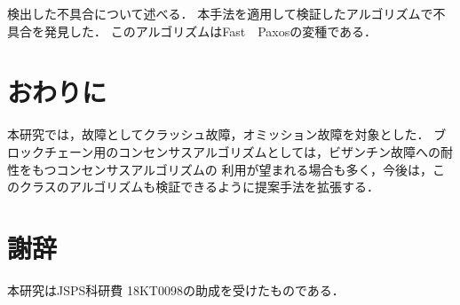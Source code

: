 \documentclass[technicalreport]{ieicej}
\theoremstyle{plain}
\begin{document}
検出した不具合について述べる．
本手法を適用して検証したアルゴリズムで不具合を発見した．
このアルゴリズムはFast　Paxosの変種である．

\section{おわりに}\label{sec:conclusion}

本研究では，故障としてクラッシュ故障，オミッション故障を対象とした．
ブロックチェーン用のコンセンサスアルゴリズムとしては，ビザンチン故障への耐性をもつコンセンサスアルゴリズムの
利用が望まれる場合も多く，今後は，このクラスのアルゴリズムも検証できるように提案手法を拡張する．

\section*{謝辞}
本研究はJSPS科研費 18KT0098の助成を受けたものである．




% 
\end{document}
